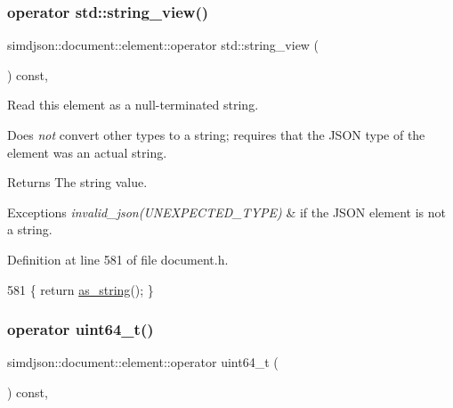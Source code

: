 \subsubsection{\texorpdfstring{operator std\+::string\+\_\+view()}{operator std::string\_view()}}
{\footnotesize\ttfamily simdjson\+::document\+::element\+::operator std\+::string\+\_\+view (\begin{DoxyParamCaption}{ }\end{DoxyParamCaption}) const\hspace{0.3cm}{\ttfamily [inline]}, {\ttfamily [noexcept]}}



Read this element as a null-\/terminated string. 

Does {\itshape not} convert other types to a string; requires that the J\+S\+ON type of the element was an actual string.

\begin{DoxyReturn}{Returns}
The string value. 
\end{DoxyReturn}

\begin{DoxyExceptions}{Exceptions}
{\em invalid\+\_\+json(\+U\+N\+E\+X\+P\+E\+C\+T\+E\+D\+\_\+\+T\+Y\+P\+E)} & if the J\+S\+ON element is not a string. \\
\hline
\end{DoxyExceptions}


Definition at line 581 of file document.\+h.


\begin{DoxyCode}
581 \{ \textcolor{keywordflow}{return} \hyperlink{classsimdjson_1_1document_1_1element_a2467d0f9e039451767947dab82622331}{as\_string}(); \}
\end{DoxyCode}
\mbox{\label{classsimdjson_1_1document_1_1element_aeeef4b2e6eec31f6eb5a87930ce4f859}} 
\subsubsection{\texorpdfstring{operator uint64\+\_\+t()}{operator uint64\_t()}}
{\footnotesize\ttfamily simdjson\+::document\+::element\+::operator uint64\+\_\+t (\begin{DoxyParamCaption}{ }\end{DoxyParamCaption}) const\hspace{0.3cm}{\ttfamily [inline]}, {\ttfamily [noexcept]}}



